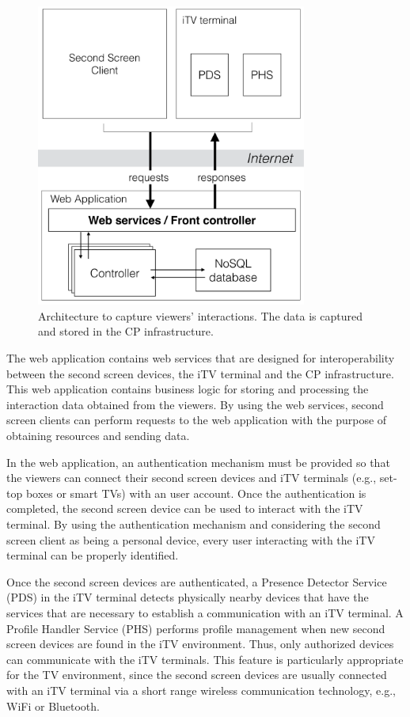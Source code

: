 \documentclass[journal]{IEEEtran}
\begin{document}
\begin{figure}[!t]
	\centering
	\includegraphics[width=3.5in]{img/architecture-overview.pdf}
	\caption{Architecture to capture viewers' interactions. The data is captured and stored in the CP infrastructure.}
	\label{fig_architecture}
\end{figure}

The web application contains web services that are designed for interoperability between the second screen devices, the iTV terminal and the CP infrastructure. This web application contains business logic for storing and processing the interaction data obtained from the viewers. By using the web services, second screen clients can perform requests to the web application with the purpose of obtaining resources and sending data. 

In the web application, an authentication mechanism must be provided so that the viewers can connect their second screen devices and iTV terminals (e.g., set-top boxes or smart TVs) with an user account. Once the authentication is completed, the second screen device can be used to interact with the iTV terminal. By using the authentication mechanism and considering the second screen client as being a personal device, every user interacting with the iTV terminal can be properly identified.

Once the second screen devices are authenticated, a Presence Detector Service (PDS) in the iTV terminal detects physically nearby devices that have the services that are necessary to establish a communication with an iTV terminal. A Profile Handler Service (PHS) performs profile management when new second screen devices are found in the iTV environment. Thus, only authorized devices can communicate with the iTV terminals. This feature is particularly appropriate for the TV environment, since the second screen devices are usually connected with an iTV terminal via a short range wireless communication technology, e.g., WiFi or Bluetooth.
\end{document}
